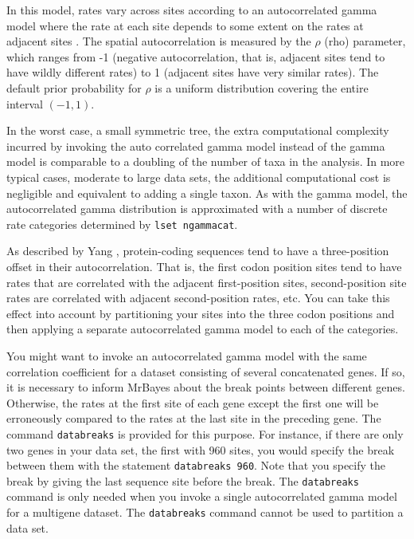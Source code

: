 \documentclass[12pt]{book}
\begin{document}
In this model, rates vary across sites according to an autocorrelated gamma model where the rate at
each site depends to some extent on the rates at adjacent sites \citep{yang95a}. The spatial
autocorrelation is measured by the $\rho$ (rho) parameter, which ranges from -1 (negative
autocorrelation, that is, adjacent sites tend to have wildly different rates) to 1 (adjacent sites
have very similar rates). The default prior probability for $\rho$ is a uniform distribution
covering the entire interval $(-1,1)$.

In the worst case, a small symmetric tree, the extra computational complexity incurred by invoking
the auto correlated gamma model instead of the gamma model is comparable to a doubling of the
number of taxa in the analysis. In more typical cases, moderate to large data sets, the additional
computational cost is negligible and equivalent to adding a single taxon. As with the gamma model,
the autocorrelated gamma distribution is approximated with a number of discrete rate categories
determined by \texttt{lset ngammacat}.

As described by Yang \citep{yang95a}, protein-coding sequences tend to have a three-position offset
in their autocorrelation. That is, the first codon position sites tend to have rates that are
correlated with the adjacent first-position sites, second-position site rates are correlated with
adjacent second-position rates, etc. You can take this effect into account by partitioning your
sites into the three codon positions and then applying a separate autocorrelated gamma model to
each of the categories.

You might want to invoke an autocorrelated gamma model with the same correlation coefficient for a
dataset consisting of several concatenated genes. If so, it is necessary to inform MrBayes about
the break points between different genes. Otherwise, the rates at the first site of each gene
except the first one will be erroneously compared to the rates at the last site in the preceding
gene. The command \texttt{databreaks} is provided for this purpose. For instance, if there are only
two genes in your data set, the first with 960 sites, you would specify the break between them with
the statement \texttt{databreaks 960}. Note that you specify the break by giving the last sequence
site before the break. The \texttt{databreaks} command is only needed when you invoke a single
autocorrelated gamma model for a multigene dataset. The \texttt{databreaks} command cannot be used
to partition a data set.
\end{document}

